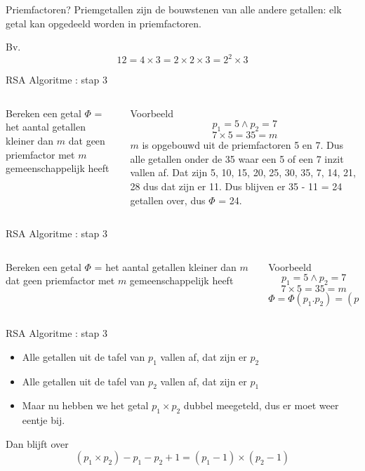 \documentclass{beamer}
\begin{document}
\begin{frame}{Priemfactoren?}
	Priemgetallen zijn de bouwstenen van alle andere getallen:  elk getal kan opgedeeld worden in priemfactoren. 
	
	Bv. 
	\[
		12 = 4 \times 3 = 2 \times 2 \times 3 = 2^2 \times 3
	\]
	
	
\end{frame}

\begin{frame}{RSA Algoritme : stap 3}
	\begin{columns}
		\begin{column}[T]{0.5\textwidth}
			Bereken een getal $\Phi$ =  het aantal getallen kleiner dan $m$ dat geen priemfactor met $m$ gemeenschappelijk heeft
		\end{column}
		\begin{column}[T]{0.5\textwidth}
			Voorbeeld
			\[ p_1 = 5 \wedge  p_2 = 7\]
			\[ 7 \times 5 = 35 = m \]
			$m$ is opgebouwd uit de priemfactoren 5 en 7. Dus alle getallen onder de 35 waar een 5 of een 7 inzit vallen af.  Dat zijn 5, 10, 15, 20, 25, 30, 35, 7, 14, 21, 28  dus dat zijn er 11. Dus blijven er 35 - 11 = 24 getallen over, dus $\Phi$ = 24.
		\end{column}
	\end{columns}	
\end{frame}

\begin{frame}{RSA Algoritme : stap 3}
	\begin{columns}
		\begin{column}[T]{0.5\textwidth}
			Bereken een getal $\Phi$ =  het aantal getallen kleiner dan $m$ dat geen priemfactor met $m$ gemeenschappelijk heeft
		\end{column}
		\begin{column}[T]{0.5\textwidth}
			Voorbeeld
			\[ p_1 = 5 \wedge  p_2 = 7\]
			\[ 7 \times 5 = 35 = m \]
			\[ \Phi = \Phi(p_1 . p_2) = (p_1 -1) \times (p_2 -1) \]
		\end{column}
	\end{columns}	
\end{frame}

\begin{frame}{RSA Algoritme : stap 3}
	\begin{itemize}
		\item Alle getallen uit de tafel van $p_1$  vallen af, dat zijn er $p_2$
		\item Alle getallen uit de tafel van $p_2$ vallen af, dat zijn er $p_1$
		\item Maar nu hebben we het getal $p_1 \times p_2$  dubbel meegeteld, dus er moet weer eentje bij.
	\end{itemize}
	
	Dan blijft over  
	\[ (p_1 \times p_2) - p_1 - p_2 + 1  =   (p_1 - 1)\times(p_2 - 1) \]
\end{frame}
\end{document}
